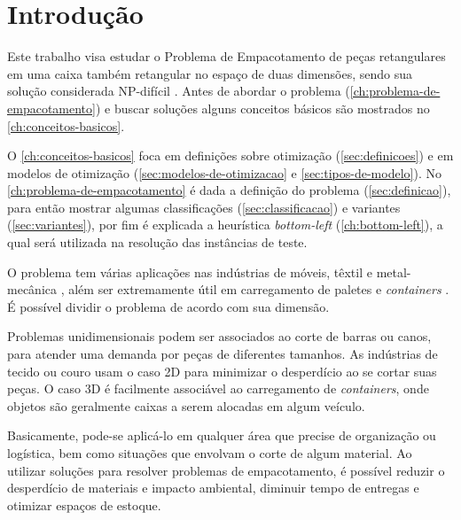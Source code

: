 \chapter*[Introdução]{Introdução}\label{ch:introducao}

Este trabalho visa estudar o Problema de Empacotamento de peças retangulares em uma caixa também retangular no espaço de duas dimensões, sendo sua solução considerada NP-difícil \cite{2DPackLib}.
Antes de abordar o problema (\autoref{ch:problema-de-empacotamento}) e buscar soluções alguns conceitos básicos são mostrados no \autoref{ch:conceitos-basicos}.

O \autoref{ch:conceitos-basicos} foca em definições sobre otimização (\autoref{sec:definicoes}) e em modelos de otimização (\autoref{sec:modelos-de-otimizacao} e \autoref{sec:tipos-de-modelo}).
No \autoref{ch:problema-de-empacotamento} é dada a definição do problema (\autoref{sec:definicao}), para então mostrar algumas classificações (\autoref{sec:classificacao}) e variantes (\autoref{sec:variantes}), por fim é explicada a heurística \textit{bottom-left} (\autoref{ch:bottom-left}), a qual será utilizada na resolução das instâncias de teste.

O problema tem várias aplicações nas indústrias de móveis, têxtil e metal-mecânica \cite{queiroz2022estudo, cavali2004problemas, belluzzo2005otimizacao}, além ser extremamente útil em carregamento de paletes e \textit{containers} \cite{morabito1992abordagem}.
É possível dividir o problema de acordo com sua dimensão.

Problemas unidimensionais podem ser associados ao corte de barras ou canos, para atender uma demanda por peças de diferentes tamanhos.
As indústrias de tecido ou couro usam o caso 2D para minimizar o desperdício ao se cortar suas peças.
O caso 3D é facilmente associável ao carregamento de \textit{containers}, onde objetos são geralmente caixas a serem alocadas em algum veículo.

Basicamente, pode-se aplicá-lo em qualquer área que precise de organização ou logística, bem como situações que envolvam o corte de algum material.
Ao utilizar soluções para resolver problemas de empacotamento, é possível reduzir o desperdício de materiais e impacto ambiental, diminuir tempo de entregas e otimizar espaços de estoque.




